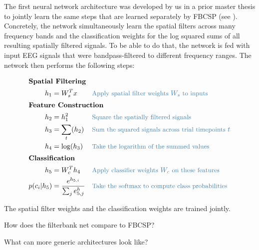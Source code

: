     The first neural network architecture was developed by us in a prior
master thesis \citep{schirrmeister_msc_thesis_2015} to
jointly learn the same steps that are learned separately by FBCSP (see
). Concretely, the network
simultaneously learn the spatial filters across many frequency bands and
the classification weights for the log squared sums of all resulting
spatially filtered signals. To be able to do that, the network is fed
with input EEG signals that were bandpass-filtered to different
frequency ranges. The network then performs the following steps:




\begin{align*}
    \intertext{\textbf{Spatial Filtering}}
    h_1 &= W_s^Tx && \codecomment{\text{Apply spatial filter weights } W_s \text{ to  inputs }} \\
    \intertext{\textbf{Feature Construction}}
    h_2 &= h_1^2 && \codecomment{\text{Square the spatially filtered signals }} \\
    h_3 &=\sum_t (h_2) && \codecomment{\text{Sum the squared signals across trial timepoints } t} \\
    h_4 &= \log(h_3) && \codecomment{\text{Take the logarithm of the summed values}}\\
    \intertext{\textbf{Classification}}
    h_5 &= W_c^Th_4 && \codecomment{\text{Apply classifier weights } W_c \text{ on these features }} \\
    p(c_i|h_5) &= \frac{e^{h_{5,i}}}{\sum_j e^h_{5,j}} && \codecomment{\text{Take the softmax to compute class probabilities}} \\
\end{align*}

    The spatial filter weights and the classification weights are trained
jointly.

\begin{openbox}
\item How does the filterbank net compare to FBCSP?
\item What can more generic architectures look like?
\end{openbox}

